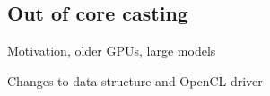 \subsection{Out of core casting}
\label{sec:out_of_core}



Motivation, older GPUs, large models

Changes to data structure and OpenCL driver

